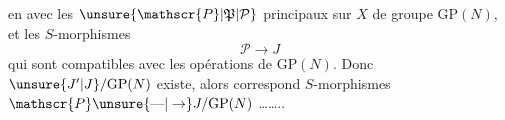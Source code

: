 en  avec les $\unsure{\mathscr{P}|\mathfrak{P}|\mathcal{P}}$ principaux sur $X$ de groupe $\mathrm{GP}(N)$, et les $S$-morphismes
\[
\mathscr{P}\longrightarrow J
\]
qui sont compatibles avec les opérations de $\mathrm{GP}(N)$.
Donc   $\unsure{J'|J}/\mathrm{GP}(N)$ existe, alors correspond  $S$-morphismes $\mathscr{P}\unsure{\text{---}|\to} J/\mathrm{GP}(N)$ \ldots\ldots..
